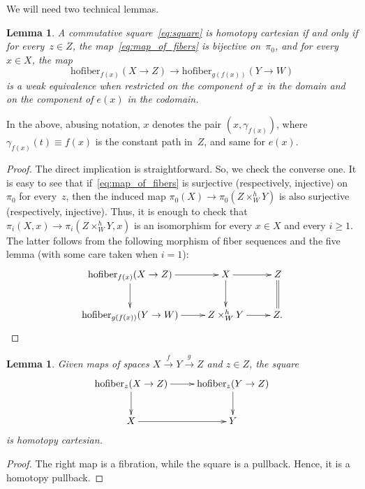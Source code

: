 \documentclass[11pt]{amsart}
\newtheorem{lemma}[theorem]{Lemma}
\theoremstyle{definition}
\newtheorem{property}{Property}
\newcommand{\hofiber}{\mathrm{hofiber}}
\numberwithin{equation}{section}
\begin{document}
We will need two  technical lemmas.


\begin{lemma}\label{l:cartesian}
A commutative square~\eqref{eq:square} is homotopy cartesian if and only if for every~$z\in Z$, the map~\eqref{eq:map_of_fibers} is bijective on~$\pi_0$, and for every~$x\in X$, the map
$$
\hofiber_{f(x)}(X\to Z)\to \hofiber_{g(f(x))}(Y\to W)
$$
is a weak equivalence when restricted on the component of $x$ in the domain and on the component of $e(x)$ in the codomain.
\end{lemma}
In the above, abusing notation, $x$ denotes the pair $(x,\gamma_{f(x)})$, where $\gamma_{f(x)}(t)\equiv f(x)$ is the constant path in~$Z$, and same for $e(x)$.

\begin{proof}
The direct implication is straightforward. So, we check the converse one. It is easy to see that if~\eqref{eq:map_of_fibers} is surjective (respectively, injective)
on~$\pi_0$ for every~$z$, then  the induced map $\pi_0(X)\to \pi_0\left(Z\times_W^h Y\right)$ is also surjective (respectively, injective).  Thus, it is enough
to check that $\pi_i(X,x)\to \pi_i\left(Z\times_W^h Y, x\right)$ is an isomorphism  for every $x\in X$ and every $i\geq 1$. The latter follows from the following morphism of fiber sequences and 
the five lemma (with some care taken when $i=1$):
\[
\xymatrix{
\hofiber_{f(x)}(X\to Z)\ar[d]\ar[r]&X\ar[d]\ar[r]&Z\ar@{=}[d]\\
\hofiber_{g(f(x))}(Y\to W)\ar[r]&Z\times_W^hY\ar[r]& Z.
}
\]


\end{proof}


\begin{lemma}\label{l:cartesian2}
Given maps of spaces $X\xrightarrow{f}Y\xrightarrow{g}Z$ and $z\in Z$, the square
\[
\xymatrix{
\hofiber_z(X\to Z)\ar[d]\ar[r]&\hofiber_z(Y\to Z)\ar[d]\\
X\ar[r]&Y
}
\]
is homotopy cartesian.
\end{lemma}


\begin{proof}
The right map is a fibration, while the square is a pullback. Hence, it is a homotopy pullback.
\end{proof}

%
%
\end{document}
